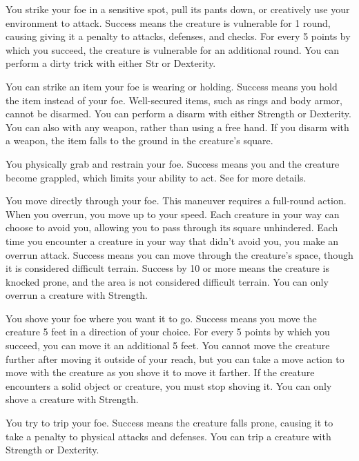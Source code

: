 \label{Dirty Trick} You strike your foe in a sensitive spot, pull its pants down, or creatively use your environment to attack. Success means the creature is vulnerable for 1 round, causing giving it a  penalty to attacks, defenses, and checks. For every 5 points by which you succeed, the creature is vulnerable for an additional round. You can perform a dirty trick with either Str or Dexterity.

\label{Disarm} You can strike an item your foe is wearing or holding. Success means you hold the item instead of your foe. Well-secured items, such as rings and body armor, cannot be disarmed. You can perform a disarm with either Strength or Dexterity. You can also with any weapon, rather than using a free hand. If you disarm with a weapon, the item falls to the ground in the creature's square.

\label{Grapple} You physically grab and restrain your foe. Success means you and the creature become grappled, which limits your ability to act. See  for more details.

\label{Overrun} You move directly through your foe. This maneuver requires a full-round action. When you overrun, you move up to your speed. Each creature in your way can choose to avoid you, allowing you to pass through its square unhindered. Each time you encounter a creature in your way that didn't avoid you, you make an overrun attack. Success means you can move through the creature's space, though it is considered difficult terrain. Success by 10 or more means the creature is knocked prone, and the area is not considered difficult terrain. You can only overrun a creature with Strength.

\label{Shove} You shove your foe where you want it to go. Success means you move the creature 5 feet in a direction of your choice. For every 5 points by which you succeed, you can move it an additional 5 feet. You cannot move the creature further after moving it outside of your reach, but you can take a move action to move with the creature as you shove it to move it farther. If the creature encounters a solid object or creature, you must stop shoving it. You can only shove a creature with Strength.

\label{Trip} You try to trip your foe. Success means the creature falls prone, causing it to take a  penalty to physical attacks and defenses. You can trip a creature with Strength or Dexterity.

